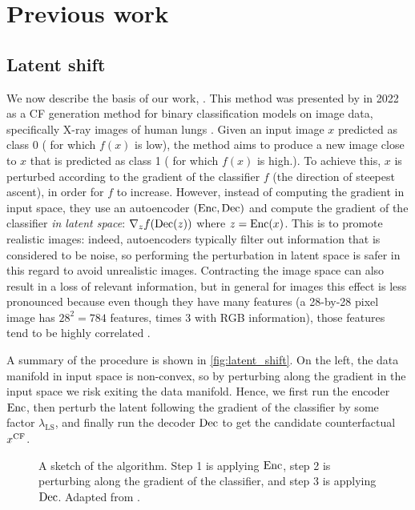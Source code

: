 \documentclass[../main.tex]{subfiles}
\begin{document}
\chapter{Previous work}
\label{ch:previous_work}

\section{Latent shift}

We now describe the basis of our work, \ls{}.
This method was presented by \citeauthor{cohenGifsplanation2022} in 2022 as a CF generation method for binary classification models on image data, specifically X-ray images of human lungs \cite{cohenGifsplanation2022}.
Given an input image $x$ predicted as class 0 (\ie{} for which $f(x)$ is low), the method aims to produce a new image close to $x$ that is predicted as class 1 (\ie{} for which $f(x)$ is high.).
To achieve this, $x$ is perturbed according to the gradient of the classifier $f$ (the direction of steepest ascent), in order for $f$ to increase.
However, instead of computing the gradient in input space, they use an autoencoder $(\operatorname{Enc}, \operatorname{Dec})$ and compute the gradient of the classifier \emph{in latent space}: $\nabla_z f(\operatorname{Dec}(z))$ where $z = \operatorname{Enc}(x)$.
This is to promote realistic images: indeed, autoencoders typically filter out information that is considered to be noise, so performing the perturbation in latent space is safer in this regard to avoid unrealistic images.
Contracting the image space can also result in a loss of relevant information, but in general for images this effect is less pronounced because even though they have many features (a 28-by-28 pixel image has $28^2 = 784$ features, times 3 with RGB information), those features tend to be highly correlated .

A summary of the \ls{} procedure is shown in \autoref{fig:latent_shift}.
On the left, the data manifold in input space is non-convex, so by perturbing along the gradient in the input space we risk exiting the data manifold.
Hence, we first run the encoder $\operatorname{Enc}$, then perturb the latent following the gradient of the classifier by some factor $\lambda_\text{LS}$, and finally run the decoder $\operatorname{Dec}$ to get the candidate counterfactual $x^\mathrm{CF}$.

\begin{figure}[htbp]
    \centering

    \caption{A sketch of the \ls{} algorithm. Step 1 is applying $\operatorname{Enc}$, step 2 is perturbing along the gradient of the classifier, and step 3 is applying $\operatorname{Dec}$. Adapted from \cite{cohenGifsplanation2022}.}
    \label{fig:latent_shift}
\end{figure}
\end{document}

